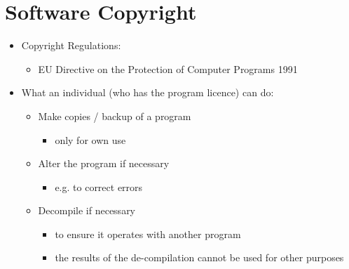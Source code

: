 \documentclass{article}
\begin{document}
\section{Software Copyright}
\begin{itemize}
\item Copyright Regulations:
\begin{itemize}
\item EU Directive on the Protection of Computer Programs 1991
\end{itemize}
\item What an individual (who has the program licence) can do:
\begin{itemize}
\item Make copies / backup of a program 
\begin{itemize}
\item only for own use
\end{itemize}
\item Alter the program if necessary
\begin{itemize}
\item e.g. to correct errors
\end{itemize}
\item Decompile if necessary
\begin{itemize}
\item to ensure it operates with another program
\item the results of the de-compilation cannot be used for other purposes
\end{itemize}
\end{itemize}
\end{itemize}
\end{document}

